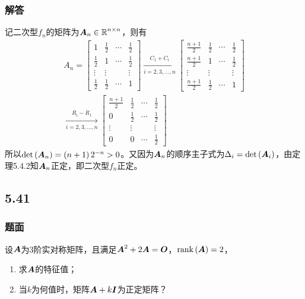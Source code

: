 \documentclass[9pt,xcolor=svgnames]{beamer} %
\begin{document}
\begin{frame}
    \frametitle{解答}
    记二次型\(f_n\)的矩阵为\(\boldsymbol{A}_n\in\boldsymbol{\mathbb{R}}^{n\times n}\)，则有
    \begin{gather*}
        A_n =
        \begin{bmatrix}
            1           & \frac{1}{2} & \cdots & \frac{1}{2} \\
            \frac{1}{2} & 1           & \cdots & \frac{1}{2} \\
            \vdots      & \vdots      &        & \vdots      \\
            \frac{1}{2} & \frac{1}{2} & \cdots & 1
        \end{bmatrix}\xrightarrow[i=2,3,\dots,n]{C_1+C_i}
        \begin{bmatrix}
            \frac{n+1}{2} & \frac{1}{2} & \cdots & \frac{1}{2} \\
            \frac{n+1}{2} & 1           & \cdots & \frac{1}{2} \\
            \vdots        & \vdots      &        & \vdots      \\
            \frac{n+1}{2} & \frac{1}{2} & \cdots & 1
        \end{bmatrix} \\
        \xrightarrow[i=2,3,\dots,n]{R_i-R_1}
        \begin{bmatrix}
            \frac{n+1}{2} & \frac{1}{2} & \cdots & \frac{1}{2} \\
            0             & \frac{1}{2} & \cdots & \frac{1}{2} \\
            \vdots        & \vdots      &        & \vdots      \\
            0             & 0           & \cdots & \frac{1}{2}
        \end{bmatrix}
    \end{gather*}
    \pause
    所以\(\mathrm{det}\left( \boldsymbol{A}_n \right)=\left( n+1 \right)2^{-n}>0\)。又因为\(\boldsymbol{A}_n\)的顺序主子式为\(\Delta_i=\mathrm{det}\left( \boldsymbol{A}_i \right)\)，由定理5.4.2知\(\boldsymbol{A}_n\)正定，即二次型\(f_n\)正定。
\end{frame}

\subsection*{5.41}
\begin{frame}
    \frametitle{题面}
    设\(\boldsymbol{A}\)为\(3\)阶实对称矩阵，且满足\(\boldsymbol{A}^2+2\boldsymbol{A}=\boldsymbol{O}\)，\(\mathrm{rank}\left( \boldsymbol{A} \right)=2\)，
    \begin{enumerate}
        \item 求\(\boldsymbol{A}\)的特征值；
        \item 当\(k\)为何值时，矩阵\(\boldsymbol{A}+k\boldsymbol{I}\)为正定矩阵？
    \end{enumerate}
\end{frame}
\end{document}
